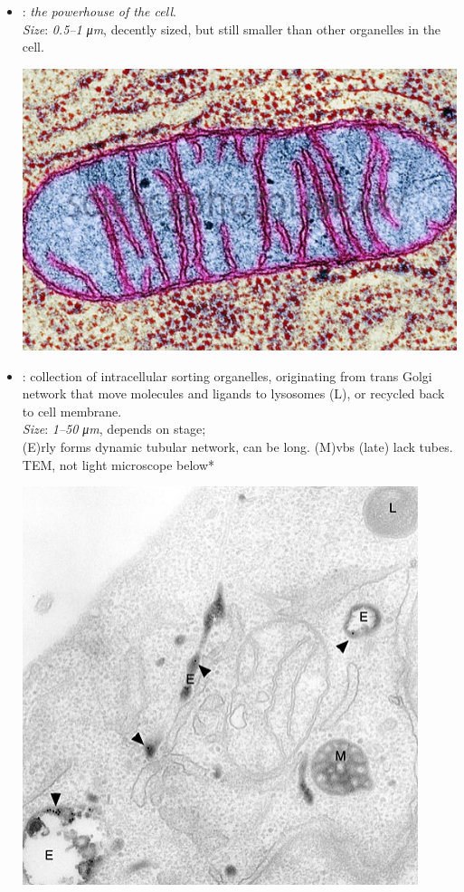 \begin{multicols}{2}
\begin{itemize}
\begin{center}
  \end{center}
  \item {}: \small{\textit{the powerhouse of the cell}}. \\
  \textit{Size}: \emph{0.5--1 \si{\micro m}}, decently sized, but still smaller than other organelles in the cell.
  \begin{center}
    \hspace{-30pt}\includegraphics[width=0.75\columnwidth]{images/week-1-powerhouse.png}
  \end{center}
  \item {}: collection of intracellular sorting organelles, originating from trans Golgi network that move molecules and ligands to lysosomes (L), or recycled back to cell membrane.\\
  \textit{Size}: \emph{1--50 \si{\micro m}}, depends on stage;\\
  (E)rly forms dynamic tubular network, can be long. %
  (M)vbs (late) lack tubes.\\ %
  TEM, not light microscope below*
  \begin{center}
    \hspace{-30pt}\includegraphics[width=0.75\columnwidth]{images/week-1-endosome.png}

\end{center}
\end{itemize}
\end{multicols}
